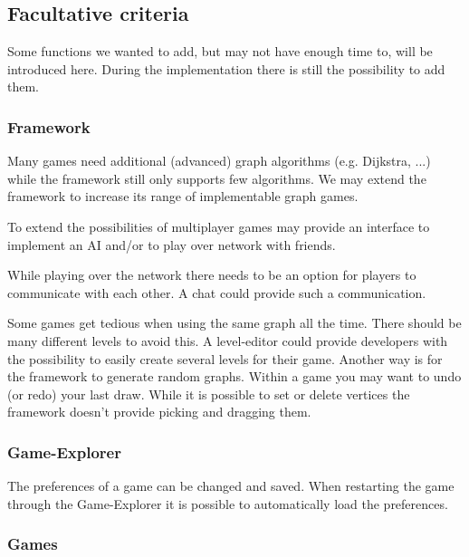 \subsection{Facultative criteria}
\label{facultative-criteria}
Some functions we wanted to add, but may not have enough time to, will be introduced here. During the implementation there is still the possibility to add them.

\subsubsection{Framework}
Many \glspl{game} need additional (advanced) \gls{graph} \glspl{algorithm} (e.g. Dijkstra, ...)	while the \gls{framework} still only supports few algorithms. We may extend the framework to increase its range of implementable graph games. \par
To extend the possibilities of multiplayer games {\graphioli} may provide an interface to implement an \gls{AI} and/or to play over network with friends. \par
While playing over the network there needs to be an option for players to communicate with each other. A \gls{chat} could provide such a communication. \par
Some games get tedious when using the same graph all the time. There should be many different \glspl{level} to avoid this. A \gls{level-editor} could provide \glspl{developer} with the possibility to easily create several levels for their game. Another way is for the framework to generate random graphs.
Within a game you may want to \gls{undo} (or \gls{redo}) your last draw.
While it is possible to set or delete vertices the framework doesn't provide picking and dragging them.

\subsubsection{Game-Explorer}
The preferences of a game can be changed and saved. When restarting the game through the Game-Explorer it is possible to automatically load the preferences. \\

\subsubsection{Games}
